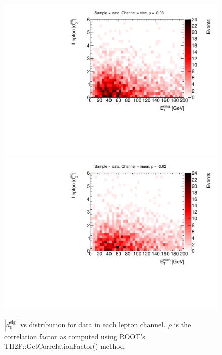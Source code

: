 \begin{figure}[!htbp]
\begin{center}

\includegraphics[scale=0.33]{./figures/boosted/ABCD/h2_d0_met_elec_data}
\includegraphics[scale=0.33]{./figures/boosted/ABCD/h2_d0_met_muon_data}
\caption{$|d_{0}^{\textrm{sig}}|$ vs \met distribution for data in each lepton channel. $\rho$ is the correlation factor
as computed using ROOT's TH2F::GetCorrelationFactor() method.}
\label{fig:boosted_qcd_d0met_data}
\end{center}
\end{figure}


